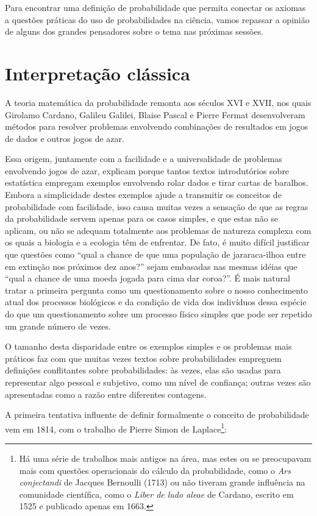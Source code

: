 Para encontrar uma definição de probabilidade que permita conectar os axiomas a questões práticas do uso de probabilidades na
ciência, vamos repassar a opinião de alguns dos grandes pensadores sobre o tema nas próximas sessões.

\section{Interpretação clássica}
A teoria matemática da probabilidade remonta aos séculos XVI e XVII, nos quais Girolamo Cardano, Galileu Galilei, Blaise Pascal
e Pierre Fermat desenvolveram métodos para resolver problemas envolvendo combinações de resultados em jogos de dados e outros
jogos de azar. 

Essa origem, juntamente com a facilidade e a universalidade de problemas envolvendo jogos de azar, explicam porque tantos textos
introdutórios sobre estatística empregam exemplos envolvendo rolar dados e tirar cartas de baralhos. Embora a simplicidade
destes exemplos ajude a transmitir os conceitos de probabilidade com facilidade, isso causa muitas vezes a sensação de que
as regras da probabilidade servem apenas para os casos simples, e que estas não se aplicam, ou não se adequam totalmente aos 
problemas de natureza complexa com os quais a biologia e a ecologia têm de enfrentar. De fato, é muito difícil justificar que
questões como ``qual a chance de que uma população de jararaca-ilhoa entre em extinção nos próximos dez anos?'' sejam embasadas
nas mesmas idéias que ``qual a chance de uma moeda jogada para cima dar coroa?''. É mais natural tratar a primeira pergunta como
um questionamento sobre o nosso conhecimento atual dos processos biológicos e da condição de vida dos indivíduos dessa espécie
do que um questionamento sobre um processo físico simples que pode ser repetido um grande número de vezes. 

O tamanho desta disparidade entre os exemplos simples e os problemas mais práticos faz com que muitas vezes
textos sobre probabilidades empreguem definições conflitantes sobre probabilidades: às vezes,
elas são usadas para representar algo pessoal e subjetivo, como um nível de confiança; outras vezes são apresentadas como a
razão entre diferentes contagens.

A primeira tentativa influente de definir formalmente o conceito de probabilidade vem em 1814,
com o trabalho de Pierre Simon de Laplace\footnote{
	Há uma série de trabalhos mais antigos na área, mas estes ou se preocupavam mais com questões
	operacionais do cálculo da probabilidade, como o {\em Ars conjectandi} de Jacques Bernoulli (1713) ou não tiveram 
	grande influência na comunidade científica, como o {\em Liber de ludo aleae} de Cardano, escrito em 1525 e 
	publicado apenas em 1663.
}:

